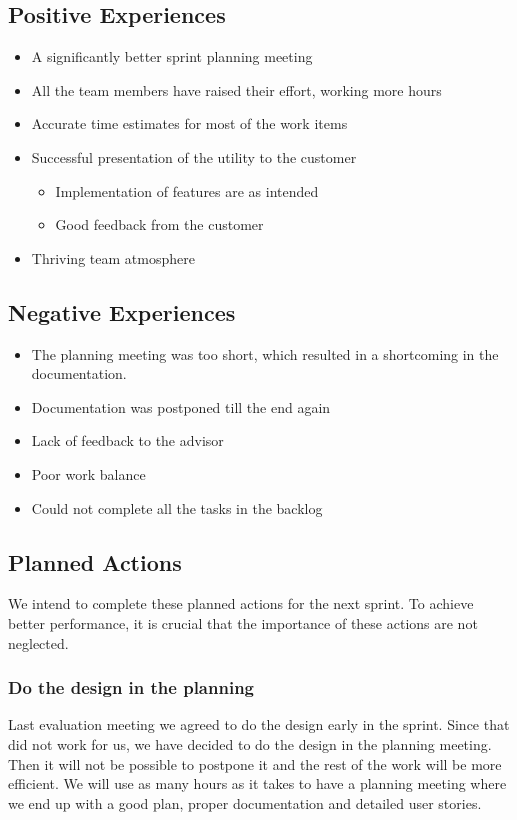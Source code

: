 {{\subsection{Positive Experiences}
\begin{itemize}
	\item A significantly better sprint planning meeting
	\item All the team members have raised their effort, working more hours
	\item Accurate time estimates for most of the work items
	\item Successful presentation of the \gls{utility} to the customer
	\begin {itemize}
		\item Implementation of features are as intended
		\item Good feedback from the customer
	\end{itemize}
	\item Thriving team atmosphere
\end{itemize}



\subsection{Negative Experiences}
\begin{itemize}
	\item The planning meeting was too short, which resulted in a shortcoming in the documentation.
	\item Documentation was postponed till the end again
	\item Lack of feedback to the advisor
	\item Poor work balance
	\item Could not complete all the tasks in the backlog
\end{itemize}


\subsection{Planned Actions}
We intend to complete these planned actions for the next sprint. To achieve better performance, it is crucial that the importance of these actions are not neglected.

\subsubsection{Do the design in the planning}
Last evaluation meeting we agreed to do the design early in the sprint. Since that did not work for us, we have decided to do the design in the planning meeting. Then it will not be possible to postpone it and the rest of the work will be more efficient. We will use as many hours as it takes to have a planning meeting where we end up with a good plan, proper documentation and detailed user stories.

}}
